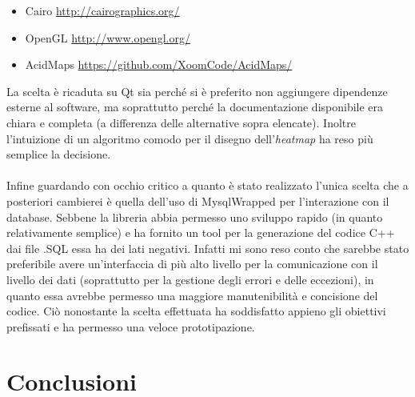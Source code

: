 \documentclass[a4paper,13pt,twoside]{article}
\begin{document}
\begin{itemize}
	\item Cairo \url{http://cairographics.org/}
	\item OpenGL \url{http://www.opengl.org/}
	\item AcidMaps \url{https://github.com/XoomCode/AcidMaps/}
\end{itemize}
La scelta è ricaduta su Qt sia perché si è preferito non aggiungere dipendenze esterne al software, ma soprattutto perché la documentazione disponibile era chiara e completa (a differenza delle alternative sopra elencate). Inoltre l'intuizione di un algoritmo comodo per il disegno  dell'\textit{heatmap} ha reso più semplice la decisione. \\ \\
Infine guardando con occhio critico a quanto è stato realizzato l'unica scelta che a posteriori cambierei è quella dell'uso di MysqlWrapped per l'interazione con il database. Sebbene la libreria abbia permesso uno sviluppo rapido (in quanto relativamente semplice) e ha fornito un tool per la generazione del codice C++ dai file .SQL essa ha dei lati negativi. Infatti mi sono reso conto che sarebbe stato preferibile avere un'interfaccia di più alto livello per la comunicazione con il livello dei dati (soprattutto per la gestione degli errori e delle eccezioni), in quanto essa avrebbe permesso una maggiore manutenibilità e concisione del codice. Ciò nonostante la scelta effettuata ha soddisfatto appieno gli obiettivi prefissati e ha permesso una veloce prototipazione.

\newpage
\section{Conclusioni}

\newpage

%
%


%

\appendix
%
%
%
\end{document}
